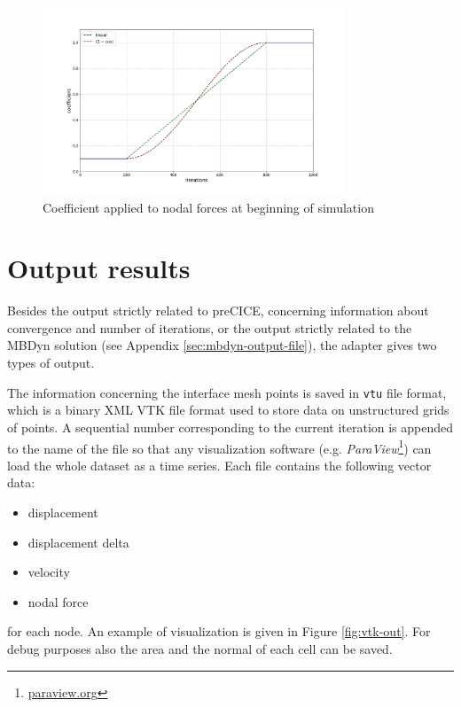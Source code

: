 

\begin{figure}[htbp!]
	\centering
	\includegraphics[width=0.8\textwidth]{images/coeff.png}
	\caption{Coefficient applied to nodal forces at beginning of simulation}
	\label{fig:sim-coeff}
\end{figure}


\section{Output results}
\label{sec:mbdyn-adapter-output}

Besides the output strictly related to preCICE, concerning information about convergence and number of iterations, or the output strictly related to the MBDyn solution (see Appendix \ref{sec:mbdyn-output-file}), the adapter gives two types of output.

The information concerning the interface mesh points is saved in \texttt{vtu} file format, which is a binary XML VTK  file format used to store data on unstructured grids of points. A sequential number corresponding to the current iteration is appended to the name of the file so that any visualization software (e.g. \textit{ParaView}\footnote{\href{https://www.paraview.org/}{paraview.org}}) can load the whole dataset as a time series. Each file contains the following vector data:

\begin{itemize}
    \item displacement
    \item displacement delta
    \item velocity
    \item nodal force
\end{itemize}

for each node. An example of visualization is given in Figure \ref{fig:vtk-out}. For debug purposes also the area and the normal of each cell can be saved. 

